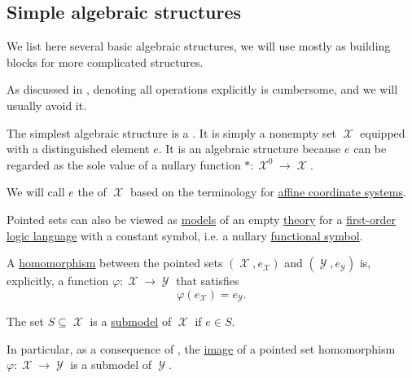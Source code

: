 \subsection{Simple algebraic structures}\label{subsec:simple_algebraic_structures}

We list here several basic algebraic structures, we will use mostly as building blocks for more complicated structures.

As discussed in , denoting all operations explicitly is cumbersome, and we will usually avoid it.

\begin{definition}\label{def:pointed_set}
  The simplest algebraic structure is a . It is simply a nonempty set \( \mscrX \) equipped with a distinguished element \( e \). It is an algebraic structure because \( e \) can be regarded as the sole value of a nullary function \( *: \mscrX^0 \to \mscrX \).

  We will call \( e \) the  of \( \mscrX \) based on the terminology for \hyperref[def:euclidean_plane_coordinate_system/origin]{affine coordinate systems}.

  \begin{thmenum}
     Pointed sets can also be viewed as \hyperref[def:first_order_semantics/satisfiability]{models} of an empty \hyperref[def:first_order_theory]{theory} for a \hyperref[def:first_order_language]{first-order logic language} with a constant symbol, i.e. a nullary \hyperref[def:first_order_language/func]{functional symbol}.

     A \hyperref[def:first_order_homomorphism]{homomorphism} between the pointed sets \( (\mscrX, e_{\mscrX}) \) and \( (\mscrY, e_{\mscrY}) \) is, explicitly, a function \( \varphi: \mscrX \to \mscrY \) that satisfies
    \begin{equation}\label{eq:def:pointed_set/homomorphism}
      \varphi(e_{\mscrX}) = e_{\mscrY}.
    \end{equation}

     The set \( S \subseteq \mscrX \) is a \hyperref[thm:substructure_is_model]{submodel} of \( \mscrX \) if \( e \in S \).

    In particular, as a consequence of , the \hyperref[def:multi_valued_function/image]{image} of a pointed set homomorphism \( \varphi: \mscrX \to \mscrY \) is a submodel of \( \mscrY \).


\end{thmenum}
\end{definition}

